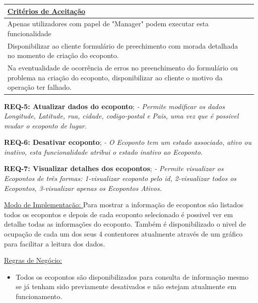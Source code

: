 \documentclass{scrreprt}
\begin{document}
		\begin{tabular}{|p{5.2in}|p{0.7in}|} \hline 
		\underline{Critérios de Aceitação} \\ \hline 
		Apenas utilizadores com papel de "Manager" podem executar esta funcionalidade \\ \hline 
		Disponibilizar ao cliente formulário de preechimento com morada detalhada no momento de criação do ecoponto.\\ \hline
		Na eventualidade de ocorrência de erros no preenchimento do formulário ou problema na criação do ecoponto, disponibilizar ao cliente o motivo da operação ter falhado.\\ \hline
	\end{tabular}\newline\newline
	

	\textbf{REQ-5: Atualizar dados do ecoponto};\newline
	\textit{- Permite modificar os dados Longitude, Latitude, rua, cidade, codigo-postal e Pais, uma vez que é possivel mudar o ecoponto de lugar.}\newline\newline
	
	\textbf{REQ-6: Desativar ecoponto};\newline
		\textit{- O Ecoponto tem um estado associado, ativo ou inativo, esta funcionalidade atribui o estado inativo ao Ecoponto.}\newline\newline
		
	\textbf{REQ-7: Visualizar detalhes dos ecopontos};\newline
	    \textit{- Permite visualizar os Ecopontos de três formas: 1-visualizar ecoponto pelo id, 2-visualizar todos os Ecopontos, 3-visualizar apenas os Ecopontos Ativos.}\newline\newline
		
		\underline{Modo de Implementação: }Para mostrar a informação de ecopontos são listados todos os ecopontos e depois de cada ecoponto selecionado é possivel ver em detalhe todas as informações do ecoponto. Também é disponibilizado o nivel de ocupação de cada um dos seus 4 contentores atualmente através de um gráfico para facilitar a leitura dos dados. \newline\newline
				
		\underline{Regras de Negócio: } 
		\begin{itemize}
		\item Todos os ecopontos são disponibilizados para consulta de informação mesmo se já tenham sido previamente desativados e não estejam atualmente em funcionamento.
    	\end{itemize}
		
\end{document}

